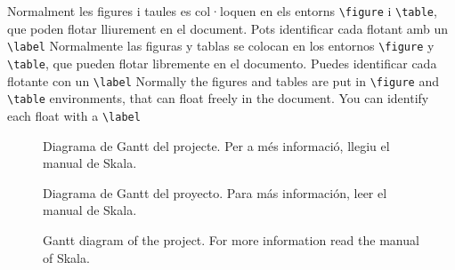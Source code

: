 \ifcase\doclanguage
\or
  Normalment les figures i taules es col·loquen en els entorns \verb|\figure| i \verb|\table|, que poden flotar lliurement en el document. Pots identificar cada flotant amb un \verb|\label|
\or
  Normalmente las figuras y tablas se colocan en los entornos \verb|\figure| y \verb|\table|, que pueden flotar libremente en el documento. Puedes identificar cada flotante con un \verb|\label|
\else
  Normally the figures and tables are put in \verb|\figure| and \verb|\table| environments, that can float freely in the document. You can identify each float with a \verb|\label|
\fi

\begin{figure}[ht]
  \centering
  
  \ifcase\doclanguage
  \or
    \caption[Diagrama de Gantt del projecte]{\footnotesize{Diagrama de Gantt del projecte. Per a més informació, llegiu el manual \cite{skalagantt} de Skala.}}
  \or
    \caption[Diagrama de Gantt del proyecto]{\footnotesize{Diagrama de Gantt del proyecto. Para más información, leer el manual \cite{skalagantt} de Skala.}}
  \else
    \caption[Project's Gantt diagram]{\footnotesize{Gantt diagram of the project. For more information read the manual \cite{skalagantt} of Skala.}}
  \fi
  \label{fig:gantt}
\end{figure}

